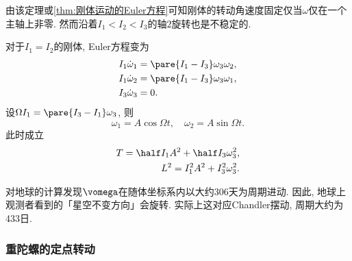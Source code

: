 \documentclass[../TheoreticalMechanics.tex]{subfiles}
\begin{document}
\begin{ex}
    由该定理或\cref{thm:刚体运动的Euler方程}可知刚体的转动角速度固定仅当$\omega$仅在一个主轴上非零. 然而沿着$I_1<I_2<I_3$的轴$2$旋转也是不稳定的.
\end{ex}
\begin{lemma}[旋转体的Euler方程]
    对于$I_1=I_2$的刚体, Euler方程变为
    \begin{align*}
        I_1\dot{\omega}_1 &= \pare{I_1 - I_3}\omega_3\omega_2,\\
        I_1\dot{\omega}_2 &= \pare{I_1 - I_3}\omega_3\omega_1,\\
        I_3\dot{\omega}_3 &= 0.
    \end{align*}
    设$\Omega I_1 = \pare{I_3-I_1}\omega_3$, 则
    \[ \omega_1 = A\cos\Omega t,\quad \omega_2 = A\sin\Omega t. \]
    此时成立
    \begin{align*}
        T = \half I_1 A^2 + \half I_3 \omega_3^2,\\
        L^2 = I_1^2 A^2 + I_3^2 \omega_3^2.
    \end{align*}
\end{lemma}
\begin{ex}
    对地球的计算发现$\vomega$在随体坐标系内以大约$306$天为周期进动. 因此, 地球上观测者看到的「星空不变方向」会旋转. 实际上这对应Chandler摆动, 周期大约为433日.
\end{ex}


\subsubsection{重陀螺的定点转动} %
\label{ssub:重陀螺的定点转动}
\end{document}
